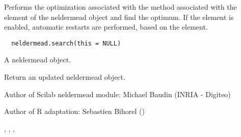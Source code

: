 %
\begin{Description}\relax
Performs the optimization associated with the method associated with the
 element of the neldermead object and find the optimum. If the
 element is enabled, automatic restarts are performed, based
on the  element.
\end{Description}
%
\begin{Usage}
\begin{verbatim}
  neldermead.search(this = NULL)
\end{verbatim}
\end{Usage}
%
\begin{Arguments}
\begin{ldescription}
\item[\code{this}] A neldermead object.
\end{ldescription}
\end{Arguments}
%
\begin{Value}
Return an updated neldermead object.
\end{Value}
%
\begin{Author}\relax
Author of Scilab neldermead module: Michael Baudin (INRIA - Digiteo)

Author of R adaptation: Sebastien Bihorel ()
\end{Author}
%
\begin{SeeAlso}\relax
{},
,
,
\end{SeeAlso}
